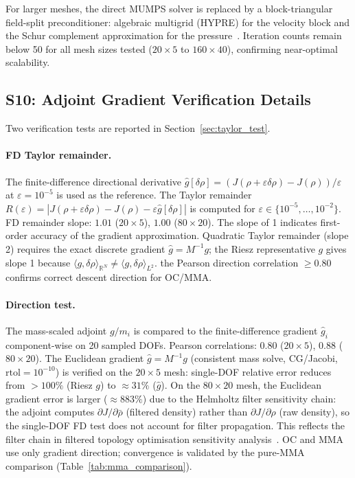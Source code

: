 For larger meshes, the direct MUMPS solver is replaced by a
block-triangular field-split preconditioner: algebraic multigrid (HYPRE)
for the velocity block and the Schur complement approximation for the
pressure~\cite{elman2014}.
Iteration counts remain below 50 for all mesh sizes tested
($20\times5$ to $160\times40$), confirming near-optimal scalability.

\subsection*{S10: Adjoint Gradient Verification Details}
\label{sec:s10}

Two verification tests are reported in Section~\ref{sec:taylor_test}.

\paragraph{FD Taylor remainder.}
The finite-difference directional derivative
$\hat{g}[\delta\rho] = (J(\rho+\varepsilon\delta\rho)-J(\rho))/\varepsilon$
at $\varepsilon=10^{-5}$ is used as the reference.
The Taylor remainder $R(\varepsilon) = |J(\rho+\varepsilon\delta\rho)-J(\rho)-\varepsilon\hat{g}[\delta\rho]|$ is computed for
$\varepsilon\in\{10^{-5},\ldots,10^{-2}\}$.
FD remainder slope: $1.01$ ($20\times5$), $1.00$ ($80\times20$).
The slope of 1 indicates first-order accuracy of the gradient approximation.
Quadratic Taylor remainder (slope 2) requires the exact discrete gradient
$\hat{g}=M^{-1}g$; the Riesz representative $g$ gives slope 1
because $\langle g,\delta\rho\rangle_{\mathbb{R}^N} \ne
\langle g,\delta\rho\rangle_{L^2}$.
the Pearson direction correlation $\geq 0.80$ confirms
correct descent direction for OC/MMA.

\paragraph{Direction test.}
The mass-scaled adjoint $g/m_i$ is compared to the finite-difference
gradient $\hat{g}_i$ component-wise on 20 sampled DOFs.
Pearson correlations: $0.80$ ($20\times5$), $0.88$ ($80\times20$).
The Euclidean gradient $\hat{g}=M^{-1}g$ (consistent mass solve,
CG/Jacobi, $\mathrm{rtol}=10^{-10}$) is verified on the
$20\times5$ mesh: single-DOF relative error reduces from
$>100\%$ (Riesz $g$) to $\approx31\%$ ($\hat{g}$).
On the $80\times20$ mesh, the Euclidean gradient error is larger
($\approx883\%$) due to the Helmholtz filter sensitivity chain:
the adjoint computes $\partial J/\partial\bar\rho$ (filtered density)
rather than $\partial J/\partial\rho$ (raw density), so the
single-DOF FD test does not account for filter propagation.
This reflects the filter chain in filtered topology optimisation
sensitivity analysis~\cite{lazarov2016}.
OC and MMA use only gradient direction; convergence is
validated by the pure-MMA comparison (Table~\ref{tab:mma_comparison}).

